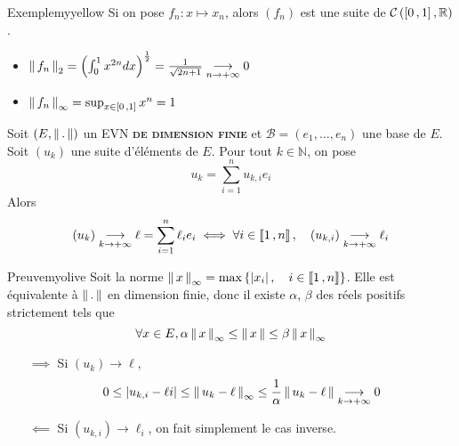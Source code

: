     \begin{omed}{Exemple}{myyellow}
        Si on pose $f_n : x \mapsto x_n$, alors $(f_n)$ est une suite de $\mathcal{C}\left(\intervalleFF{0}{1}, \mathbb{R}\right)$.
        \begin{itemize}
            \item $\nnorm{2}{f_n} = \left(\int_{0}^{1} x^{2n} dx\right)^{\frac{1}{2}} = \frac{1}{\sqrt{2n + 1}} \limi{n}{+\infty} 0$ 
            \item $\nnorm{\infty}{f_n} = \sup_{x \in \intervalleFF{0}{1}} x^n = 1$
        \end{itemize}
    \end{omed}

    \begin{prop}
        Soit $(E, \norm{.})$ un EVN \textbf{\textsc{de dimension finie}} et $\mathcal{B} = (e_1,\ldots, e_n)$ une base de $E$. Soit $(u_k)$ une suite d’éléments de $E$. Pour tout $k \in \mathbb{N}$, on pose 
        \[ u_k = \sum_{i=1}^{n} u_{k,i} e_i \] 
        Alors 
        \[ (u_k) \limi{k}{+\infty} \ell = \sum_{i=1}^{n} \ell_i e_i \iff \forall i \in \intervalleEntier{1}{n}, \quad (u_{k,i}) \limi{k}{+\infty} \ell_i \]  
    \end{prop}

    \begin{demo}{Preuve}{myolive}
        Soit la norme $\nnorm{\infty}{x} = \max\left\{\abs{x_i}, \quad i \in \intervalleEntier{1}{n}\right\}$. Elle est équivalente à $\norm{.}$ en dimension finie, donc il existe $\alpha$, $\beta$ des réels positifs strictement tels que 
        \[ \forall x \in E, \alpha \nnorm{\infty}{x} \leq \norm{x} \leq \beta \nnorm{\infty}{x} \]   
        \begin{itemize}
            \item[$\implies$] Si $(u_k) \to \ell$, 
            \[ 0 \leq \abs{u_{k,i} - \ell i} \leq \nnorm{\infty}{u_k - \ell} \leq \frac{1}{\alpha} \norm{u_k - \ell} \limi{k}{+\infty} 0 \]   
            \item[$\impliedby$] Si $(u_{k,i}) \to \ell_i$, on fait simplement le cas inverse.
        \end{itemize} 
    \end{demo}

